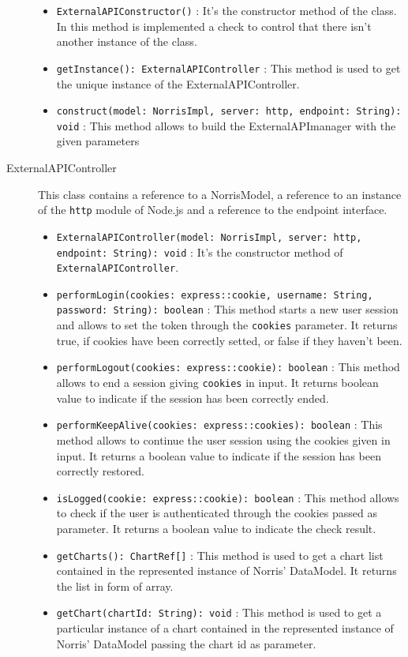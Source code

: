 \begin{description}
\begin{itemize}
		\item \texttt{ExternalAPIConstructor()} : It's the constructor method of the class. In this method is implemented a check to control that there isn't another instance of the class.
		\item \texttt{getInstance(): ExternalAPIController} : This method is used to get the unique instance of the ExternalAPIController.
		\item \texttt{construct(model: NorrisImpl, server: http, endpoint: String): void} : This method allows to build the ExternalAPImanager with the given parameters
	\end{itemize}
	\item[ExternalAPIController] This class contains a reference to a NorrisModel, a reference to an instance of the \texttt{http} module of Node.js and a reference to the endpoint interface.
		\begin{itemize}
			\item \texttt{ExternalAPIController(model: NorrisImpl, server: http, endpoint: String): void} : It's the constructor method of \texttt{ExternalAPIController}.
			\item \texttt{performLogin(cookies: express::cookie, username: String, password: String): boolean} : This method starts a new user session and allows to set the token through the \texttt{cookies} parameter. It returns true, if cookies have been correctly setted, or false if they haven't been.
			\item \texttt{performLogout(cookies: express::cookie): boolean} : This method allows to end a session giving \texttt{cookies} in input. It returns  boolean value to indicate if the session has been correctly ended.
			\item \texttt{performKeepAlive(cookies: express::cookies): boolean} : This method allows to continue the user session using the cookies given in input. It returns a boolean value to indicate if the session has been correctly restored.
			\item \texttt{isLogged(cookie: express::cookie): boolean} : This method allows to check if the user is authenticated through the cookies passed as parameter. It returns a boolean value to indicate the check result.
			\item \texttt{getCharts(): ChartRef[]} : This method is used to get a chart list contained in the represented instance of Norris' DataModel. It returns the list in form of array.
			\item \texttt{getChart(chartId: String): void} : This method is used to get a particular instance of a chart contained in the represented instance of Norris' DataModel passing the chart id as parameter.

\end{itemize}
\end{description}
